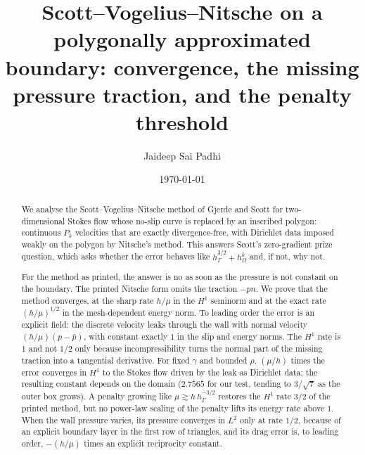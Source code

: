 \documentclass[11pt,reqno]{amsart}
\theoremstyle{plain}
\theoremstyle{definition}
\begin{document}
\title[Scott--Vogelius--Nitsche on polygonal boundaries]{Scott--Vogelius--Nitsche on a polygonally approximated boundary: convergence, the missing pressure traction, and the penalty threshold}
\author{Jaideep Sai Padhi}
\address{Department of Computer Science, Purdue University, West Lafayette, IN 47907, USA}
\date{\today}

\begin{abstract}
We analyse the Scott--Vogelius--Nitsche method of Gjerde and Scott for two-dimensional Stokes flow whose no-slip curve is replaced by an inscribed polygon: continuous $P_k$ velocities that are exactly divergence-free, with Dirichlet data imposed weakly on the polygon by Nitsche's method. This answers Scott's zero-gradient prize question, which asks whether the error behaves like $h_\Gamma^{3/2}+h_\Omega^k$ and, if not, why not.

For the method as printed, the answer is no as soon as the pressure is not constant on the boundary. The printed Nitsche form omits the traction $-pn$. We prove that the method converges, at the sharp rate $h/\mu$ in the $H^1$ seminorm and at the exact rate $(h/\mu)^{1/2}$ in the mesh-dependent energy norm. To leading order the error is an explicit field: the discrete velocity leaks through the wall with normal velocity $(h/\mu)(p-\bar p)$, with constant exactly $1$ in the slip and energy norms. The $H^1$ rate is $1$ and not $1/2$ only because incompressibility turns the normal part of the missing traction into a tangential derivative. For fixed $\gamma$ and bounded $\rho$, $(\mu/h)$ times the error converges in $H^1$ to the Stokes flow driven by the leak as Dirichlet data; the resulting constant depends on the domain ($2.7565$ for our test, tending to $3/\sqrt7$ as the outer box grows). A penalty growing like $\mu\gtrsim h\,h_\Gamma^{-3/2}$ restores the $H^1$ rate $3/2$ of the printed method, but no power-law scaling of the penalty lifts its energy rate above $1$. When the wall pressure varies, its pressure converges in $L^2$ only at rate $1/2$, because of an explicit boundary layer in the first row of triangles, and its drag error is, to leading order, $-(h/\mu)$ times an explicit reciprocity constant.


\end{abstract}
\end{document}
